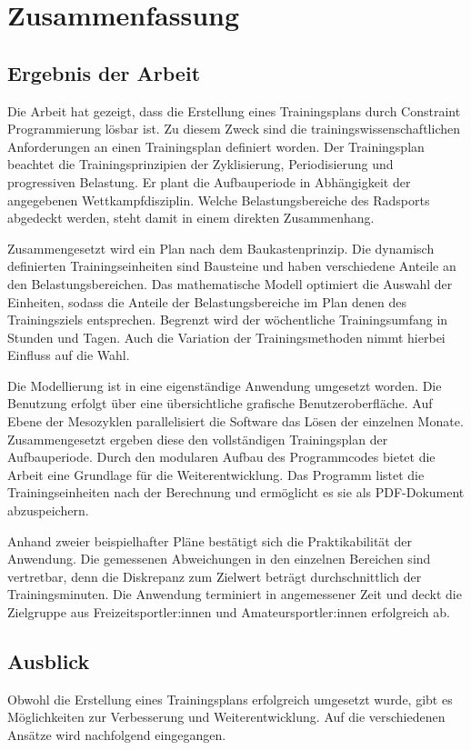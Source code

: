 \chapter{Zusammenfassung}
\label{sec:zusammenfassung}
\section{Ergebnis der Arbeit}
\label{sec:zusammenfassung:ergebnis}
Die Arbeit hat gezeigt, dass die Erstellung eines Trainingsplans durch Constraint Programmierung lösbar ist. Zu diesem Zweck sind die trainingswissenschaftlichen Anforderungen an einen Trainingsplan definiert worden. Der Trainingsplan beachtet die Trainingsprinzipien der Zyklisierung, Periodisierung und progressiven Belastung. Er plant die Aufbauperiode in Abhängigkeit der angegebenen Wettkampfdisziplin. Welche Belastungsbereiche des Radsports abgedeckt werden, steht damit in einem direkten Zusammenhang. \par 
Zusammengesetzt wird ein Plan nach dem Baukastenprinzip. Die dynamisch definierten Trainingseinheiten sind Bausteine und haben verschiedene Anteile an den Belastungsbereichen. Das mathematische Modell optimiert die Auswahl der Einheiten, sodass die Anteile der Belastungsbereiche im Plan denen des Trainingsziels entsprechen. Begrenzt wird der wöchentliche Trainingsumfang in Stunden und Tagen. Auch die Variation der Trainingsmethoden nimmt hierbei Einfluss auf die Wahl. \par
Die Modellierung ist in eine eigenständige Anwendung umgesetzt worden. Die Benutzung erfolgt über eine übersichtliche grafische Benutzeroberfläche. Auf Ebene der Mesozyklen parallelisiert die Software das Lösen der einzelnen Monate. Zusammengesetzt ergeben diese den vollständigen Trainingsplan der Aufbauperiode. Durch den modularen Aufbau des Programmcodes bietet die Arbeit eine Grundlage für die Weiterentwicklung. Das Programm listet die Trainingseinheiten nach der Berechnung und ermöglicht es sie als PDF-Dokument abzuspeichern. \par
Anhand zweier beispielhafter Pläne bestätigt sich die Praktikabilität der Anwendung. Die gemessenen Abweichungen in den einzelnen Bereichen sind vertretbar, denn die Diskrepanz zum Zielwert beträgt durchschnittlich  der Trainingsminuten. Die Anwendung terminiert in angemessener Zeit und deckt die Zielgruppe aus Freizeitsportler:innen und Amateursportler:innen erfolgreich ab.

\section{Ausblick}
\label{sec:zusammenfassung:ausblick}
Obwohl die Erstellung eines Trainingsplans erfolgreich umgesetzt wurde, gibt es Möglichkeiten zur Verbesserung und Weiterentwicklung. Auf die verschiedenen Ansätze wird nachfolgend eingegangen.

